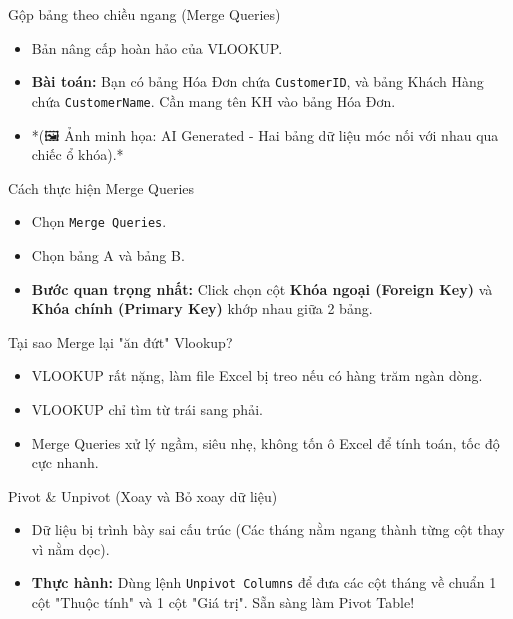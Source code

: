 \documentclass[aspectratio=169]{beamer}
\begin{document}
\begin{frame}{Gộp bảng theo chiều ngang (Merge Queries)}
    \begin{itemize}
        \item Bản nâng cấp hoàn hảo của VLOOKUP.
        \item \textbf{Bài toán:} Bạn có bảng Hóa Đơn chứa \texttt{CustomerID}, và bảng Khách Hàng chứa \texttt{CustomerName}. Cần mang tên KH vào bảng Hóa Đơn.
        \item *(🖼️ Ảnh minh họa: AI Generated - Hai bảng dữ liệu móc nối với nhau qua chiếc ổ khóa).*
    \end{itemize}
\end{frame}


\begin{frame}{Cách thực hiện Merge Queries}
    \begin{itemize}
        \item Chọn \texttt{Merge Queries}.
        \item Chọn bảng A và bảng B.
        \item \textbf{Bước quan trọng nhất:} Click chọn cột \textbf{Khóa ngoại (Foreign Key)} và \textbf{Khóa chính (Primary Key)} khớp nhau giữa 2 bảng.
    \end{itemize}
\end{frame}


\begin{frame}{Tại sao Merge lại "ăn đứt" Vlookup?}
    \begin{itemize}
        \item VLOOKUP rất nặng, làm file Excel bị treo nếu có hàng trăm ngàn dòng.
        \item VLOOKUP chỉ tìm từ trái sang phải.
        \item Merge Queries xử lý ngầm, siêu nhẹ, không tốn ô Excel để tính toán, tốc độ cực nhanh.
    \end{itemize}
\end{frame}


\begin{frame}{Pivot \& Unpivot (Xoay và Bỏ xoay dữ liệu)}
    \begin{itemize}
        \item Dữ liệu bị trình bày sai cấu trúc (Các tháng nằm ngang thành từng cột thay vì nằm dọc).
        \item \textbf{Thực hành:} Dùng lệnh \texttt{Unpivot Columns} để đưa các cột tháng về chuẩn 1 cột "Thuộc tính" và 1 cột "Giá trị". Sẵn sàng làm Pivot Table!
    \end{itemize}
\end{frame}
\end{document}
